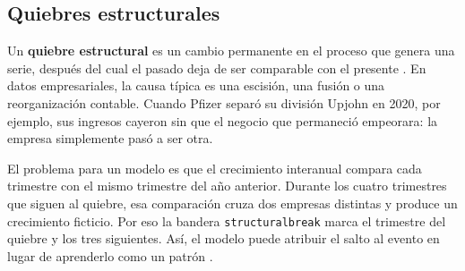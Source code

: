 \documentclass[12pt,letterpaper,oneside]{report}
\renewcommand{\_}{\UnderscoreOriginal\allowbreak}
\begin{document}
\subsection{Quiebres estructurales}
\label{sec:quiebres}

Un \textbf{quiebre estructural} es un cambio permanente en el proceso que genera una serie, después del cual el pasado deja de ser comparable con el presente \parencite{Bai1998,hamilton1989regime}. En datos empresariales, la causa típica es una escisión, una fusión o una reorganización contable. Cuando Pfizer separó su división Upjohn en 2020, por ejemplo, sus ingresos cayeron sin que el negocio que permaneció empeorara: la empresa simplemente pasó a ser otra.

El problema para un modelo es que el crecimiento interanual compara cada trimestre con el mismo trimestre del año anterior. Durante los cuatro trimestres que siguen al quiebre, esa comparación cruza dos empresas distintas y produce un crecimiento ficticio. Por eso la bandera \texttt{structural\_break} marca el trimestre del quiebre y los tres siguientes. Así, el modelo puede atribuir el salto al evento en lugar de aprenderlo como un patrón \parencite{hyndman2021fpp}.
\end{document}
